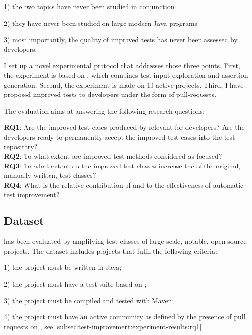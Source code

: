 1) the two topics have never been studied in conjunction

2) they have never been studied on large modern Java programs

3) most importantly, the quality of improved tests has never been assessed by developers.

I set up a novel experimental protocol that addresses those three points.
First, the experiment is based on \dspot, which combines test input exploration and assertion generation.
Second, the experiment is made on 10 active \gh projects.
Third, I have proposed improved tests to developers under the form of pull-requests.

The evaluation aims at answering the following research questions:

\newcommand\rqpullrequest{RQ1\xspace}
\newcommand\rqcandidates{RQ2\xspace}
\newcommand\rqeffectiveness{RQ3\xspace}
\newcommand\rqAmplVersusIAmpl{RQ4\xspace}

\noindent\textbf{\rqpullrequest}: Are the improved test cases produced by \dspot relevant for developers? Are the developers ready to permanently accept the improved test cases into the test repository?\\
\textbf{\rqcandidates}: To what extent are improved test methods considered as focused?\\
\textbf{\rqeffectiveness}: To what extent do the improved test classes increase the \ms of the original,  manually-written, test classes?\\
\textbf{\rqAmplVersusIAmpl}: What is the relative contribution of \Iampl{} and \Aampl{} to the effectiveness of automatic test improvement?\\

\subsection{Dataset}
\label{subsec:test-improvement:experiment-protocol:dataset}

\dspot has been evaluated by amplifying test classes of large-scale, notable, open-source projects. 
The dataset includes projects that fulfil the following criteria:

1) the project must be written in Java; 

2) the project must have a test suite based on \junit;

3) the project must be compiled and tested with Maven;

4) the project must have an active community as defined by the presence of pull requests on \gh, see \autoref{subsec:test-improvement:experiment-results:rq1}. 

